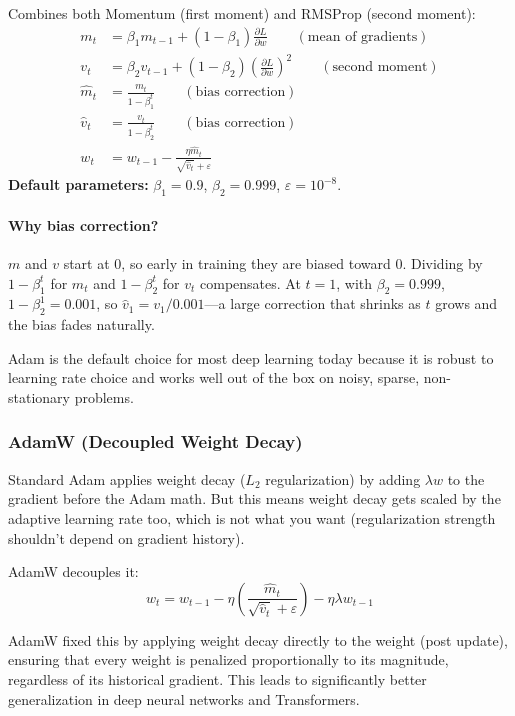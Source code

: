 Combines both Momentum (first moment) and RMSProp (second moment):
\begin{align}
m_t &= \beta_1 m_{t-1} + (1 - \beta_1) \frac{\partial L}{\partial w} \qquad (\text{mean of gradients}) \\
v_t &= \beta_2 v_{t-1} + (1 - \beta_2) \left( \frac{\partial L}{\partial w} \right)^2 \qquad (\text{second moment}) \\
\hat{m}_t &= \frac{m_t}{1 - \beta_1^t} \qquad (\text{bias correction}) \\
\hat{v}_t &= \frac{v_t}{1 - \beta_2^t} \qquad (\text{bias correction}) \\
w_t &= w_{t-1} - \frac{\eta \hat{m}_t}{\sqrt{\hat{v}_t} + \varepsilon}
\end{align}
\textbf{Default parameters:} $\beta_1 = 0.9$, $\beta_2 = 0.999$, $\varepsilon = 10^{-8}$.

\paragraph{Why bias correction?} $m$ and $v$ start at $0$, so early in training they are biased toward $0$. Dividing by $1 - \beta_1^t$ for $m_t$ and $1 - \beta_2^t$ for $v_t$ compensates. At $t=1$, with $\beta_2 = 0.999$, $1 - \beta_2^1 = 0.001$, so $\hat{v}_1 = v_1 / 0.001$---a large correction that shrinks as $t$ grows and the bias fades naturally.

Adam is the default choice for most deep learning today because it is robust to learning rate choice and works well out of the box on noisy, sparse, non-stationary problems.

\subsubsection{AdamW (Decoupled Weight Decay)}

Standard Adam applies weight decay ($L_2$ regularization) by adding $\lambda w$ to the gradient before the Adam math. But this means weight decay gets scaled by the adaptive learning rate too, which is not what you want (regularization strength shouldn't depend on gradient history).

AdamW decouples it:
\begin{equation}
w_t = w_{t-1} - \eta \left( \frac{\hat{m}_t}{\sqrt{\hat{v}_t} + \varepsilon} \right) - \eta \lambda w_{t-1}
\end{equation}

AdamW fixed this by applying weight decay directly to the weight (post update), ensuring that every weight is penalized proportionally to its magnitude, regardless of its historical gradient. This leads to significantly better generalization in deep neural networks and Transformers.

